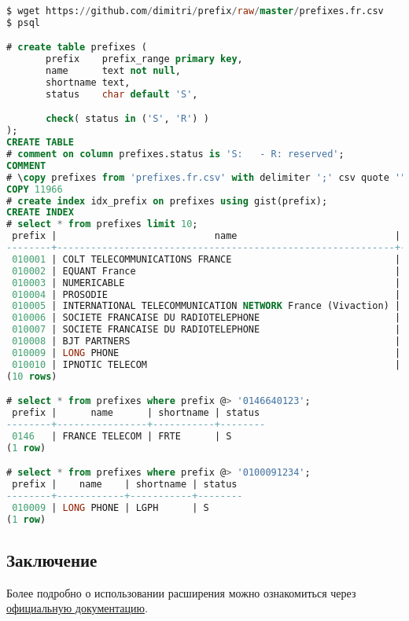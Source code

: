 \begin{lstlisting}[language=SQL,label=lst:pgprefixexample2,caption=Проверка prefix]
$ wget https://github.com/dimitri/prefix/raw/master/prefixes.fr.csv
$ psql

# create table prefixes (
       prefix    prefix_range primary key,
       name      text not null,
       shortname text,
       status    char default 'S',

       check( status in ('S', 'R') )
);
CREATE TABLE
# comment on column prefixes.status is 'S:   - R: reserved';
COMMENT
# \copy prefixes from 'prefixes.fr.csv' with delimiter ';' csv quote '"'
COPY 11966
# create index idx_prefix on prefixes using gist(prefix);
CREATE INDEX
# select * from prefixes limit 10;
 prefix |                            name                            | shortname | status
--------+------------------------------------------------------------+-----------+--------
 010001 | COLT TELECOMMUNICATIONS FRANCE                             | COLT      | S
 010002 | EQUANT France                                              | EQFR      | S
 010003 | NUMERICABLE                                                | NURC      | S
 010004 | PROSODIE                                                   | PROS      | S
 010005 | INTERNATIONAL TELECOMMUNICATION NETWORK France (Vivaction) | ITNF      | S
 010006 | SOCIETE FRANCAISE DU RADIOTELEPHONE                        | SFR       | S
 010007 | SOCIETE FRANCAISE DU RADIOTELEPHONE                        | SFR       | S
 010008 | BJT PARTNERS                                               | BJTP      | S
 010009 | LONG PHONE                                                 | LGPH      | S
 010010 | IPNOTIC TELECOM                                            | TLNW      | S
(10 rows)

# select * from prefixes where prefix @> '0146640123';
 prefix |      name      | shortname | status
--------+----------------+-----------+--------
 0146   | FRANCE TELECOM | FRTE      | S
(1 row)

# select * from prefixes where prefix @> '0100091234';
 prefix |    name    | shortname | status
--------+------------+-----------+--------
 010009 | LONG PHONE | LGPH      | S
(1 row)
\end{lstlisting}


\subsection{Заключение}

Более подробно о использовании расширения можно ознакомиться через \href{https://github.com/dimitri/prefix/blob/master/README.md}{официальную документацию}.
